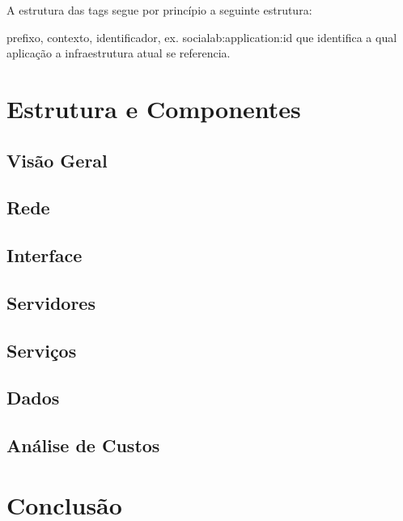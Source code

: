 \documentclass[12pt, a4paper]{report}
\begin{document}
A estrutura das tags segue por princípio a seguinte estrutura:

prefixo, contexto, identificador, ex. socialab:application:id
que identifica a qual aplicação a infraestrutura atual se referencia.

\chapter{Estrutura e Componentes}

\section{Visão Geral}

\section{Rede}

\section{Interface}
\section{Servidores}
\section{Serviços}
\section{Dados}
\section{Análise de Custos}

\chapter{Conclusão}
\end{document}

